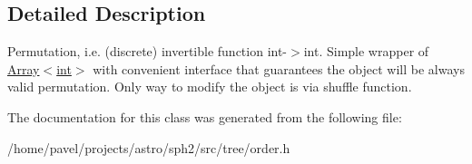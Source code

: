 \subsection{Detailed Description}
Permutation, i.\+e. (discrete) invertible function int-\/$>$int. Simple wrapper of \hyperlink{classArray}{Array$<$int$>$} with convenient interface that guarantees the object will be always valid permutation. Only way to modify the object is via {\ttfamily shuffle} function. 

The documentation for this class was generated from the following file\+:\begin{DoxyCompactItemize}
\item 
/home/pavel/projects/astro/sph2/src/tree/order.\+h\end{DoxyCompactItemize}
